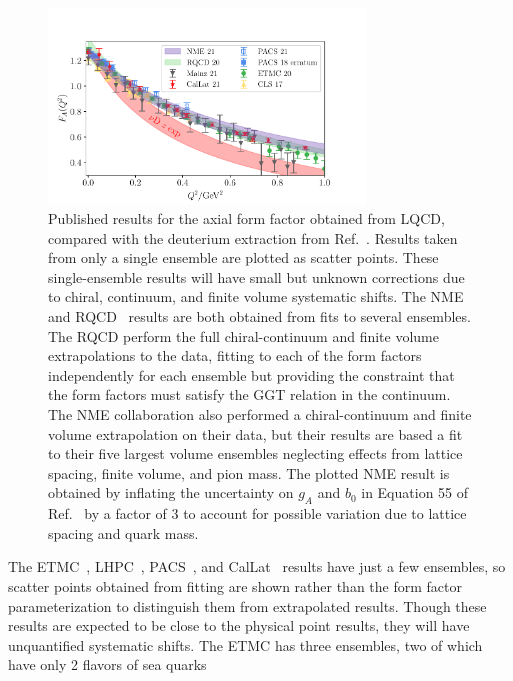 \documentclass{ar-1col}
\begin{document}
\begin{figure}[hbt!]
\centering
\includegraphics[width=0.75\textwidth]{plots/gaq2-overlay-standalone.pdf}
\vspace{10pt}
\caption{
Published results for the axial form factor obtained from LQCD,
 compared with the deuterium extraction from Ref.~\cite{Meyer:2016oeg}.
Results taken from only a single ensemble are plotted as scatter points.
These single-ensemble results will have small but unknown corrections due to chiral, continuum,
 and finite volume systematic shifts.
The NME~\cite{Park:2021ypf} and RQCD~\cite{RQCD:2019jai}
 results are both obtained from fits to several ensembles.
The RQCD perform the full chiral-continuum and finite volume extrapolations to the data,
 fitting to each of the form factors independently for each ensemble but providing
 the constraint that the form factors must satisfy the GGT relation in the continuum.
The NME collaboration also performed a chiral-continuum and finite volume extrapolation
 on their data, but
 their results are based a fit to their five largest volume ensembles neglecting
 effects from lattice spacing, finite volume, and pion mass.
The plotted NME result is obtained
 by inflating the uncertainty on $g_A$ and $b_0$ in Equation 55
 of Ref.~\cite{Park:2021ypf} by a factor of 3
 to account for possible variation due to lattice spacing and quark mass.
}
\label{fig:gaq2_overlay}
\end{figure}
The ETMC~\cite{Alexandrou:2020okk}, LHPC~\cite{Hasan:2017wwt},
 PACS~\cite{Ishikawa:2018rew,Shintani:2018ozy,Ishikawa:2021eut}, and CalLat~\cite{Meyer:2021vfq}
 results have just a few ensembles, so scatter points obtained from fitting
 are shown rather than the form factor parameterization to distinguish
 them from extrapolated results.
Though these results are expected to be close to the physical point results,
 they will have unquantified systematic shifts.
The ETMC has three ensembles, two of which have only 2 flavors of sea quarks
\end{document}
